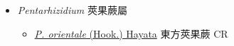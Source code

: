 
  \begin{itemize}
 \item[    ] \textit{Pentarhizidium} 莢果蕨屬
                                
  \begin{itemize}
        \item[] \href{http://www.theplantlist.org/tpl1.1/search?q=Pentarhizidium+orientale}{\textit{P. orientale} (Hook.) Hayata}   東方莢果蕨   CR
  \end{itemize}
  \end{itemize}
